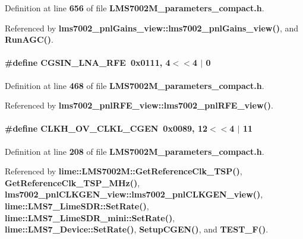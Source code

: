 Definition at line {\bf 656} of file {\bf L\+M\+S7002\+M\+\_\+parameters\+\_\+compact.\+h}.



Referenced by {\bf lms7002\+\_\+pnl\+Gains\+\_\+view\+::lms7002\+\_\+pnl\+Gains\+\_\+view()}, and {\bf Run\+A\+G\+C()}.

\paragraph[{C\+G\+S\+I\+N\+\_\+\+L\+N\+A\+\_\+\+R\+FE}]{\setlength{\rightskip}{0pt plus 5cm}\#define C\+G\+S\+I\+N\+\_\+\+L\+N\+A\+\_\+\+R\+FE~0x0111, 4$<$$<$4 $\vert$  0}\label{LMS7002M__parameters__compact_8h_a6454dbf6b27e0f48eaa79344a9ec8788}


Definition at line {\bf 468} of file {\bf L\+M\+S7002\+M\+\_\+parameters\+\_\+compact.\+h}.



Referenced by {\bf lms7002\+\_\+pnl\+R\+F\+E\+\_\+view\+::lms7002\+\_\+pnl\+R\+F\+E\+\_\+view()}.

\paragraph[{C\+L\+K\+H\+\_\+\+O\+V\+\_\+\+C\+L\+K\+L\+\_\+\+C\+G\+EN}]{\setlength{\rightskip}{0pt plus 5cm}\#define C\+L\+K\+H\+\_\+\+O\+V\+\_\+\+C\+L\+K\+L\+\_\+\+C\+G\+EN~0x0089, 12$<$$<$4 $\vert$  11}\label{LMS7002M__parameters__compact_8h_a89a63e7d78a3e45a2d311b034165df1c}


Definition at line {\bf 208} of file {\bf L\+M\+S7002\+M\+\_\+parameters\+\_\+compact.\+h}.



Referenced by {\bf lime\+::\+L\+M\+S7002\+M\+::\+Get\+Reference\+Clk\+\_\+\+T\+S\+P()}, {\bf Get\+Reference\+Clk\+\_\+\+T\+S\+P\+\_\+\+M\+Hz()}, {\bf lms7002\+\_\+pnl\+C\+L\+K\+G\+E\+N\+\_\+view\+::lms7002\+\_\+pnl\+C\+L\+K\+G\+E\+N\+\_\+view()}, {\bf lime\+::\+L\+M\+S7\+\_\+\+Lime\+S\+D\+R\+::\+Set\+Rate()}, {\bf lime\+::\+L\+M\+S7\+\_\+\+Lime\+S\+D\+R\+\_\+mini\+::\+Set\+Rate()}, {\bf lime\+::\+L\+M\+S7\+\_\+\+Device\+::\+Set\+Rate()}, {\bf Setup\+C\+G\+E\+N()}, and {\bf T\+E\+S\+T\+\_\+\+F()}.

